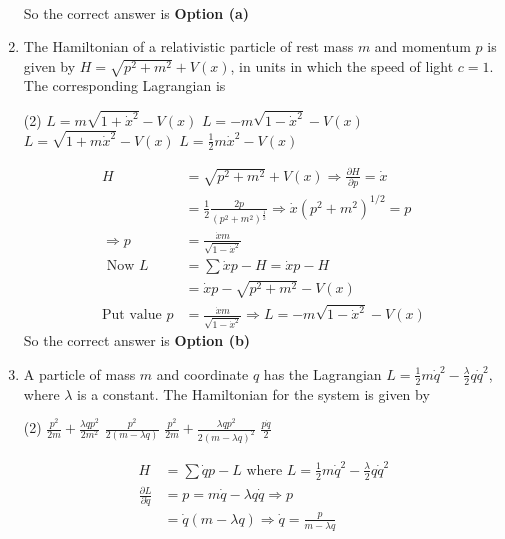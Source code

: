 \begin{enumerate}
\begin{answer}
\begin{align*}
	\end{align*}
	So the correct answer is \textbf{Option (a)}
\end{answer}
	\item  The Hamiltonian of a relativistic particle of rest mass $m$ and momentum $p$ is given by $H=\sqrt{p^{2}+m^{2}}+V(x)$, in units in which the speed of light $c=1$. The corresponding Lagrangian is
	{}
	\begin{tasks}(2)
		\task[\textbf{a.}]$L=m \sqrt{1+\dot{x}^{2}}-V(x)$
		\task[\textbf{b.}]$L=-m \sqrt{1-\dot{x}^{2}}-V(x)$
		\task[\textbf{c.}]$L=\sqrt{1+m \dot{x}^{2}}-V(x)$
		\task[\textbf{d.}] $L=\frac{1}{2} m \dot{x}^{2}-V(x)$
	\end{tasks}
\begin{answer}
	\begin{align*}
	H&=\sqrt{p^{2}+m^{2}}+V(x) \Rightarrow \frac{\partial H}{\partial p}=\dot{x}\\&=\frac{1}{2} \frac{2 p}{\left(p^{2}+m^{2}\right)^{\frac{1}{2}}} \Rightarrow \dot{x}\left(p^{2}+m^{2}\right)^{1 / 2}=p\\
	\Rightarrow p&=\frac{\dot{x} m}{\sqrt{1-\dot{x}^{2}}}\\
	\text{ Now }L&=\sum \dot{x} p-H=\dot{x} p-H\\&=\dot{x} p-\sqrt{p^{2}+m^{2}}-V(x)\\
	\text{Put value }p&=\frac{\dot{x} m}{\sqrt{1-\dot{x}^{2}}} \Rightarrow L=-m \sqrt{1-\dot{x}^{2}}-V(x)
	\end{align*}
	So the correct answer is \textbf{Option (b)}
\end{answer}
	\item  A particle of mass $m$ and coordinate $q$ has the Lagrangian $L=\frac{1}{2} m \dot{q}^{2}-\frac{\lambda}{2} q \dot{q}^{2}$, where $\lambda$ is a constant. The Hamiltonian for the system is given by
	{}
	\begin{tasks}(2)
		\task[\textbf{a.}]$\frac{p^{2}}{2 m}+\frac{\lambda q p^{2}}{2 m^{2}}$
		\task[\textbf{b.}]$\frac{p^{2}}{2(m-\lambda q)}$
		\task[\textbf{c.}] $\frac{p^{2}}{2 m}+\frac{\lambda q p^{2}}{2(m-\lambda q)^{2}}$
		\task[\textbf{d.}] $\frac{p \dot{q}}{2}$
	\end{tasks}
\begin{answer}
	\begin{align*}
	H&=\sum \dot{q} p-L\text{ where }L=\frac{1}{2} m \dot{q}^{2}-\frac{\lambda}{2} q \dot{q}^{2}\\
	\frac{\partial L}{\partial \dot{q}}&=p=m \dot{q}-\lambda q \dot{q} \Rightarrow p\\&=\dot{q}(m-\lambda q) \Rightarrow \dot{q}=\frac{p}{m-\lambda q}\\

\end{align*}
\end{answer}
\end{enumerate}
